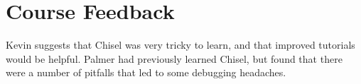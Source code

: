 \documentclass[twocolumn]{article}
\begin{document}
\section{Course Feedback}

Kevin suggests that Chisel was very tricky to learn, and that improved
tutorials would be helpful.  Palmer had previously learned Chisel, but
found that there were a number of pitfalls that led to some debugging
headaches.



\end{document}
